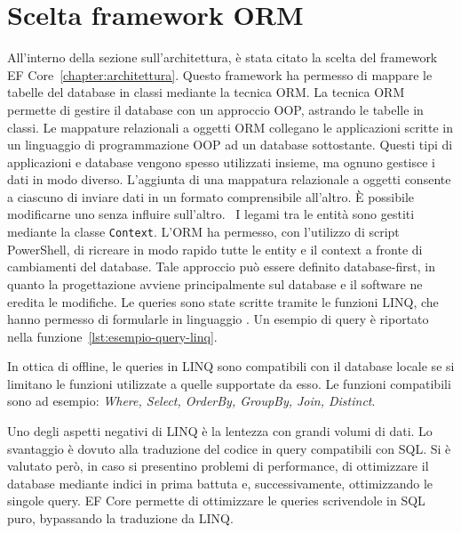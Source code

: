 \section{Scelta framework ORM}
All'interno della sezione sull'architettura, è stata citato la scelta del framework \ac{EF Core}~\ref{chapter:architettura}.
Questo framework ha permesso di mappare le tabelle del database in classi mediante la tecnica \ac{ORM}.
La tecnica \ac{ORM} permette di gestire il database con un approccio \ac{OOP}, astrando le tabelle in classi.
Le mappature relazionali a oggetti \ac{ORM} collegano le applicazioni scritte in un linguaggio di programmazione
\ac{OOP} ad un database sottostante.
Questi tipi di applicazioni e database vengono spesso utilizzati insieme,
ma ognuno gestisce i dati in modo diverso. L’aggiunta di una mappatura relazionale
a oggetti consente a ciascuno di inviare dati in un formato comprensibile all’altro.
È possibile modificarne uno senza influire sull’altro.~\cite{ORM}
I legami tra le entità sono gestiti mediante la classe \texttt{Context}.
L'\ac{ORM} ha permesso, con l'utilizzo di script PowerShell,
di ricreare in modo rapido tutte le entity e il context a fronte di cambiamenti del database.
Tale approccio può essere definito database-first, in quanto la progettazione avviene principalmente sul database
e il software ne eredita le modifiche.
Le queries sono state scritte tramite le funzioni \ac{LINQ}, che hanno permesso di formularle in linguaggio \csharp{}.
Un esempio di query è riportato nella funzione~\ref{lst:esempio-query-linq}.


In ottica di offline, le queries in \ac{LINQ} sono compatibili con il database locale \sqlite{} se si limitano
le funzioni utilizzate a quelle supportate da esso.
Le funzioni compatibili sono ad esempio: \textit{Where, Select, OrderBy, GroupBy, Join, Distinct}.

Uno degli aspetti negativi di \ac{LINQ} è la lentezza con grandi volumi di dati.
Lo svantaggio è dovuto alla traduzione del codice in query compatibili con \ac{SQL}.
Si è valutato però, in caso si presentino problemi di performance,
di ottimizzare il database mediante indici in prima battuta
e, successivamente, ottimizzando le singole query.
\ac{EF Core} permette di ottimizzare le queries scrivendole in \ac{SQL} puro,
bypassando la traduzione da \ac{LINQ}.

